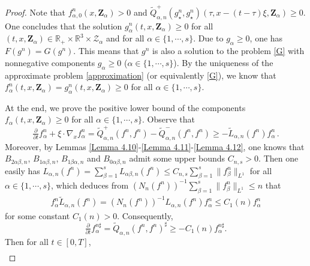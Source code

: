 \documentclass[reqno,11pt]{amsart}
\numberwithin{equation}{section}
\def\R{\mathbb{R}}
\begin{document}
\begin{proof}
Note that $f_{\alpha, 0}^n (x, \mathbf{Z}_\alpha) > 0$ and $\tilde{Q}^+_{\alpha ,n} ( g^n_\star, g^n_\star ) (\tau, x - (t - \tau) \xi, \mathbf{Z}_\alpha ) \geq 0$. One concludes that the solution $g^n_\alpha (t,x,\mathbf{Z}_\alpha) \geq 0$ for all $(t,x,\mathbf{Z}_\alpha) \in \R_+ \times \R^3 \times \mathcal{Z}_\alpha$ and for all $\alpha \in \{ 1, \cdots, s \}$. Due to $g_\alpha \geq 0$, one has $F (g^n) = G (g^n)$. This means that $g^n$ is also a solution to the problem \eqref{G} with nonnegative components $g_\alpha \geq 0$ ($ \alpha \in \{ 1, \cdots, s \} $). By the uniqueness of the approximate problem \eqref{approximation} (or equivalently \eqref{G}), we know that $f^n_\alpha(t,x,\mathbf{Z}_\alpha) = g^n_\alpha(t,x,\mathbf{Z}_\alpha) \geq 0$ for all $\alpha \in \{ 1, \cdots, s \}$.

At the end, we prove the positive lower bound of the components $f_\alpha (t,x, \mathbf{Z}_\alpha) \geq 0$ for all $\alpha \in \{ 1, \cdots, s \}$. Observe that
	\begin{equation*}
		\tfrac{\partial }{\partial t} f^n_\alpha +\xi \cdot \nabla_x f^n_\alpha = \tilde{Q}^+_{\alpha ,n} (f^n ,f^n)-\tilde{Q}^-_{\alpha ,n} (f^n ,f^n) \geq - \tilde{L}_{\alpha ,n} (f^n)f^n_\alpha \,.
	\end{equation*}
Moreover, by Lemmas \ref{Lemma 4.10}-\ref{Lemma 4.11}-\ref{Lemma 4.12}, one knows that $B_{2 \alpha \beta, n}$, $B_{1 \alpha \beta, n}$, $B_{1 \beta \alpha, n}$ and $B_{0 \alpha \beta, n}$ admit some upper bounds $C_{n,s} > 0$. Then one easily has $L_{\alpha, n} (f^n) = \sum_{\beta = 1}^{s} L_{\alpha \beta, n} (f^n) \leq C_{n,s} \sum_{\beta = 1}^{s} \| f_\beta^n \|_{L^1}$ for all $\alpha \in \{ 1, \cdots, s \}$, which deduces from $ ( N_n (f^n) )^{-1} \sum_{\beta = 1}^{s} \| f_\beta^n \|_{L^1} \leq n $ that
	\begin{equation*}
		\begin{aligned}
			f^n_\alpha \tilde{L}_{\alpha,n} (f^n) = ( N_n (f^n) )^{-1} {L}_{\alpha,n} (f^n) f^n_\alpha \leq C_1 ( n) f^n_\alpha 
		\end{aligned}
	\end{equation*}
for some constant $C_1 (n) > 0$. Consequently,
	\begin{equation*}
		\tfrac{\partial }{\partial t} f^{n\sharp}_\alpha = \tilde{Q}_{\alpha,n} (f^n,f^n)^\sharp \geq - C_1(n) f^{n\sharp}_\alpha.
	\end{equation*}
Then for all $t \in [0, T]$,
\begin{equation*}
  \begin{aligned}

\end{aligned}
\end{equation*}
\end{proof}
\end{document}

